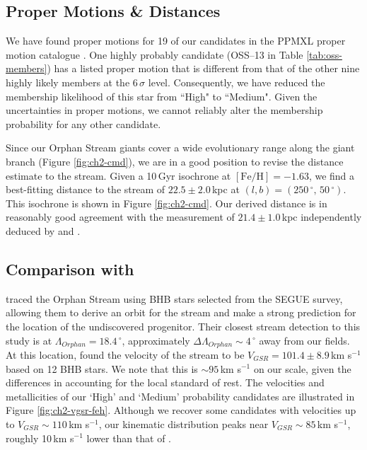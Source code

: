 \break
\subsection{Proper Motions \& Distances}

We have found proper motions for 19 of our candidates in the PPMXL proper motion catalogue \citep{Roeser_et-al_2010}. One highly probably candidate (OSS--13 in Table \ref{tab:oss-members}) has a listed proper motion that is different from that of the other nine highly likely members at the $6\,\sigma$ level. Consequently, we have reduced the membership likelihood of this star from ``High" to ``Medium". Given the uncertainties in proper motions, we cannot reliably alter the membership probability for any other candidate.

Since our Orphan Stream giants cover a wide evolutionary range along the giant branch (Figure \ref{fig:ch2-cmd}), we are in a good position to revise the distance estimate to the stream. Given a 10\,Gyr \citet{Girardi_et-al_2008} isochrone at $[\mbox{Fe/H}] = -1.63$, we find a best-fitting distance to the stream of $22.5 \pm 2.0$\,kpc at $(l, b) = (250\,^\circ,\,50\,^\circ)$. This isochrone is shown in Figure \ref{fig:ch2-cmd}. Our derived distance is in reasonably good agreement with the measurement of $21.4 \pm 1.0$\,kpc independently deduced by \citet{Grillmair_2006} and \citet{Newberg_et-al_2010}.


\subsection{Comparison with \citet{Newberg_et-al_2010}}
\label{sec:ch2-newberg}
\citet{Newberg_et-al_2010} traced the Orphan Stream using BHB stars selected from the SEGUE survey, allowing them to derive an orbit for the stream and make a strong prediction for the location of the undiscovered progenitor. Their closest stream detection to this study is at $\Lambda_{Orphan} = 18.4\,^\circ$, approximately $\Delta\Lambda_{Orphan} \sim 4\,^\circ$ away from our fields. At this location, \citet{Newberg_et-al_2010} found the velocity of the stream to be $V_{GSR} = 101.4 \pm 8.9$\,km s$^{-1}$ based on 12 BHB stars. We note that this is $\sim95$\,km s$^{-1}$ on our scale, given the differences in accounting for the local standard of rest. The velocities and metallicities of our `High' and `Medium' probability candidates are illustrated in Figure \ref{fig:ch2-vgsr-feh}. Although we recover some candidates with velocities up to $V_{GSR} \sim 110$\,km s$^{-1}$, our kinematic distribution peaks near $V_{GSR} \sim 85$\,km s$^{-1}$, roughly 10\,km s$^{-1}$ lower than that of \citet{Newberg_et-al_2010}.

